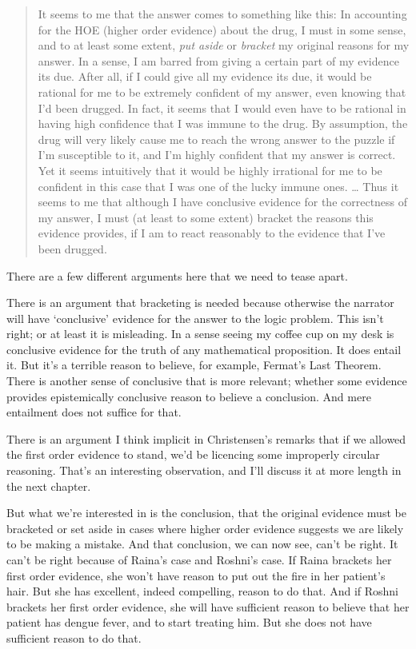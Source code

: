 \begin{quote}
It seems to me that the answer comes to something like this: In accounting for the HOE (higher order evidence) about the drug, I must in some sense, and to at least some extent, \emph{put aside} or \emph{bracket} my original reasons for my answer. In a sense, I am barred from giving a certain part of my evidence its due. After all, if I could give all my evidence its due, it would be rational for me to be extremely conﬁdent of my answer, even knowing that I'd been drugged. In fact, it seems that I would even have to be rational in having high confidence that I was immune to the drug. By assumption, the drug will very likely cause me to reach the wrong answer to the puzzle if I'm susceptible to it, and I'm highly conﬁdent that my answer is correct. Yet it seems intuitively that it would be highly irrational for me to be conﬁdent in this case that I was one of the lucky immune ones. {\ldots} Thus it seems to me that although I have conclusive evidence for the correctness of my answer, I must (at least to some extent) bracket the reasons this evidence provides, if I am to react reasonably to the evidence that I've been drugged. ~\citep[194-5, emphasis in original]{Christensen2010a}
\end{quote}
There are a few different arguments here that we need to tease apart.

There is an argument that bracketing is needed because otherwise the narrator will have `conclusive' evidence for the answer to the logic problem. This isn't right; or at least it is misleading. In a sense seeing my coffee cup on my desk is conclusive evidence for the truth of any mathematical proposition. It does entail it. But it's a terrible reason to believe, for example, Fermat's Last Theorem. There is another sense of conclusive that is more relevant; whether some evidence provides epistemically conclusive reason to believe a conclusion. And mere entailment does not suffice for that.

There is an argument I think implicit in Christensen's remarks that if we allowed the first order evidence to stand, we'd be licencing some improperly circular reasoning. That's an interesting observation, and I'll discuss it at more length in the next chapter.

But what we're interested in is the conclusion, that the original evidence must be bracketed or set aside in cases where higher order evidence suggests we are likely to be making a mistake. And that conclusion, we can now see, can't be right. It can't be right because of Raina's case and \gls{Roshni}'s case. If Raina brackets her first order evidence, she won't have reason to put out the fire in her patient's hair. But she has excellent, indeed compelling, reason to do that. And if \gls{Roshni} brackets her first order evidence, she will have sufficient reason to believe that her patient has dengue fever, and to start treating him. But she does not have sufficient reason to do that.


